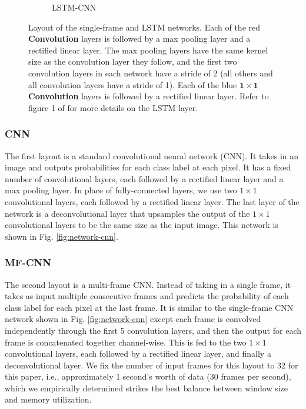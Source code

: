 \documentclass[runningheads,a4paper]{llncs}
\begin{document}
\begin{figure}[t]
\begin{subfigure}{12.0cm}
    \caption{LSTM-CNN}
    \label{fig:network-lstm}
\end{subfigure}
\caption{Layout of the single-frame and LSTM networks. Each of the red {\bf Convolution} layers is followed by a max pooling layer and a rectified linear layer. The max pooling layers have the same kernel size as the convolution layer they follow, and the first two convolution layers in each network have a stride of 2 (all others and all convolution layers have a stride of 1). Each of the blue {\bf $\mathbf{1{\times}1}$ Convolution} layers is followed by a rectified linear layer. Refer to figure 1 of \cite{greff2015} for more details on the LSTM layer.}
\label{fig:network}
\vspace{-0.5cm}
\end{figure}

\vspace{-0.5cm}
\subsubsection{CNN} 

The first layout is a standard convolutional neural network (CNN). It takes in an image and outputs probabilities for each class label at each pixel. It has a fixed number of convolutional layers, each followed by a rectified linear layer and a max pooling layer. In place of fully-connected layers, we use two $1 \times 1$ convolutional layers, each followed by a rectified linear layer. The last layer of the network is a deconvolutional layer that upsamples the output of the $1 \times 1$ convolutional layers to be the same size as the input image. This network is shown in Fig. \ref{fig:network-cnn}.

\vspace{-0.5cm}
\subsubsection{MF-CNN} 

The second layout is a multi-frame CNN. Instead of taking in a single frame, it takes as input multiple consecutive frames and predicts the probability of each class label for each pixel at the last frame. It is similar to the single-frame CNN network shown in Fig. \ref{fig:network-cnn} except each frame is convolved independently through the first 5 convolution layers, and then the output for each frame is concatenated together channel-wise. This is fed to the two $1 \times 1$ convolutional layers, each followed by a rectified linear layer, and finally a deconvolutional layer. We fix the number of input frames for this layout to 32 for this paper, i.e., approximately 1 second's worth of data (30 frames per second), which we empirically determined strikes the best balance between window size and memory utilization.
\end{document}
